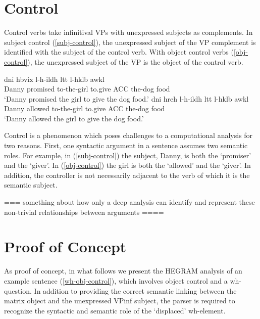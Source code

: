 \documentclass[a4paper]{article}
\begin{document}
\section{Control}
Control verbs take infinitival VPs with unexpressed subjects as complements. In subject control (\ref{subj-control}), the unexpressed subject of the VP complement is identified with the subject of the control verb. With object control verbs (\ref{obj-control}), the unexpressed subject of the VP is the object of the control verb.

      \begin{exe}
         \ex \begin{xlist}

            \ex\label{subj-control}
                \gll dni hbvix l-h-ildh ltt l-hklb awkl\\
                     Danny promised to-the-girl to.give ACC the-dog food \\
                \trans `Danny promised the girl to give the dog food.'
            \ex\label{obj-control}
                \gll dni hreh l-h-ildh ltt l-hklb awkl\\
                     Danny allowed to-the-girl to.give ACC the-dog food \\
                \trans `Danny allowed the girl to give the dog food.'
         \end{xlist}
    \end{exe}

Control is a phenomenon which poses challenges to a computational analysis for two reasons. First, one syntactic argument in a sentence assumes two semantic roles. For example, in (\ref{subj-control}) the subject, Danny, is both the `promiser' and the `giver'. In (\ref{obj-control}) the girl is both the `allowed' and the `giver'. In addition, the controller is not necessarily adjacent to the verb of which it is the semantic subject.

 === something about how only a deep analysis can identify and represent these non-trivial relationships between arguments ====

\section{Proof of Concept}

 As proof of concept, in what follows we present the HEGRAM analysis of an example sentence (\ref{wh-obj-control}),  which involves object control and a wh-question. In addition to providing the correct semantic linking between the matrix object and the unexpressed VPinf subject, the parser is required to recognize the syntactic and semantic role of the `displaced' wh-element.
\end{document}
